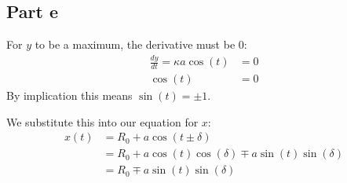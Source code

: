 \documentclass[12pt]{article}
\begin{document}
\subsection*{Part e}
For $y$ to be a maximum, the derivative must be 0:
\begin{align}
\frac{dy}{dt} = \kappa a \cos(t) &= 0 \\
\cos(t) &= 0
\end{align}
By implication this means $\sin(t) = \pm 1$.

We substitute this into our equation for $x$:
\begin{align}
x(t) &= R_0 + a \cos ( t \pm \delta ) \\
&= R_0 + a \cos(t) \cos(\delta) \mp a \sin(t) \sin(\delta) \\
&= R_0 \mp a \sin(t) \sin(\delta)
\end{align}
\end{document}
